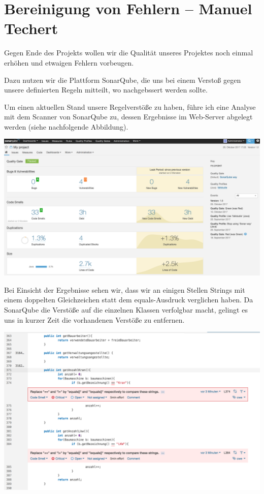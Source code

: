 \chapter{Bereinigung von Fehlern -- Manuel Techert}

Gegen Ende des Projekts wollen wir die Qualität unseres Projektes noch einmal erhöhen und etwaigen Fehlern vorbeugen.

Dazu nutzen wir die Plattform SonarQube, die uns bei einem Verstoß gegen unsere definierten Regeln mitteilt, wo nachgebssert werden sollte. 

Um einen aktuellen Stand unsere Regelverstöße zu haben, führe ich eine Analyse mit dem Scanner von SonarQube zu, dessen Ergebnisse im Web-Server abgelegt werden (siehe nachfolgende Abbildung).
\\

\begin{minipage}{\linewidth}
	\centering 
	\includegraphics[scale=0.35]{img/startSonar}
	\vspace{2em}
\end{minipage}

Bei Einsicht der Ergebnisse sehen wir, dass wir an einigen Stellen Strings mit einem doppelten Gleichzeichen statt dem equals-Ausdruck verglichen haben. Da SonarQube die Verstöße auf die einzelnen Klassen verfolgbar macht, gelingt es uns in kurzer Zeit die vorhandenen Verstöße zu entfernen.

\begin{minipage}{\linewidth}
	\centering 
	\includegraphics[scale=0.45]{img/fehlerSonar}
	\vspace{2em}
\end{minipage}
